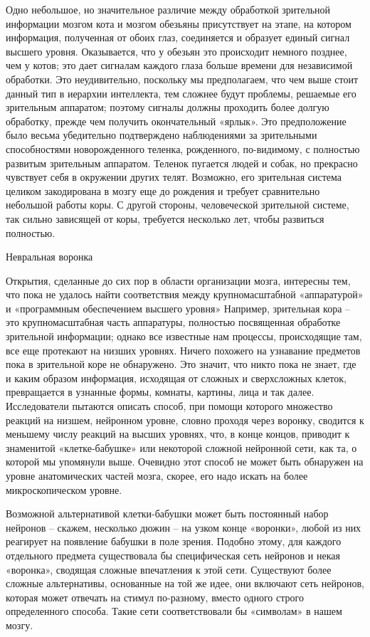 \documentclass[../main.tex]{subfiles}
\begin{document}
Одно небольшое, но значительное различие между обработкой зрительной информации мозгом кота и мозгом обезьяны присутствует на этапе, на котором информация, полученная от обоих глаз, соединяется и образует единый сигнал высшего уровня. Оказывается, что у обезьян это происходит немного позднее, чем у котов; это дает сигналам каждого глаза больше времени для независимой обработки. Это неудивительно, поскольку мы предполагаем, что чем выше стоит данный тип в иерархии интеллекта, тем сложнее будут проблемы, решаемые его зрительным аппаратом; поэтому сигналы должны проходить более долгую обработку, прежде чем получить окончательный «ярлык». Это предположение было весьма убедительно подтверждено наблюдениями за зрительными способностями новорожденного теленка, рожденного, по-видимому, с полностью развитым зрительным аппаратом. Теленок пугается людей и собак, но прекрасно чувствует себя в окружении других телят. Возможно, его зрительная система целиком закодирована в мозгу еще до рождения и требует сравнительно небольшой работы коры. С другой стороны, человеческой зрительной системе, так сильно зависящей от коры, требуется несколько лет, чтобы развиться полностью.

Невральная воронка

Открытия, сделанные до сих пор в области организации мозга, интересны тем, что пока не удалось найти соответствия между крупномасштабной «аппаратурой» и «программным обеспечением высшего уровня» Например, зрительная кора \--- это крупномасштабная часть аппаратуры, полностью посвященная обработке зрительной информации; однако все известные нам процессы, происходящие там, все еще протекают на низших уровнях. Ничего похожего на узнавание предметов пока в зрительной коре не обнаружено. Это значит, что никто пока не знает, где и каким образом информация, исходящая от сложных и сверхсложных клеток, превращается в узнанные формы, комнаты, картины, лица и так далее. Исследователи пытаются описать способ, при помощи которого множество реакций на низшем, нейронном уровне, словно проходя через воронку, сводится к меньшему числу реакций на высших уровнях, что, в конце концов, приводит к знаменитой «клетке-бабушке» или некоторой сложной нейронной сети, как та, о которой мы упомянули выше. Очевидно этот способ не может быть обнаружен на уровне анатомических частей мозга, скорее, его надо искать на более микроскопическом уровне.

Возможной альтернативой клетки-бабушки может быть постоянный набор нейронов \--- скажем, несколько дюжин \--- на узком конце «воронки», любой из них реагирует на появление бабушки в поле зрения. Подобно этому, для каждого отдельного предмета существовала бы специфическая сеть нейронов и некая «воронка», сводящая сложные впечатления к этой сети. Существуют более сложные альтернативы, основанные на той же идее, они включают сеть нейронов, которая может отвечать на стимул по-разному, вместо одного строго определенного способа. Такие сети соответствовали бы «символам» в нашем мозгу.
\end{document}
